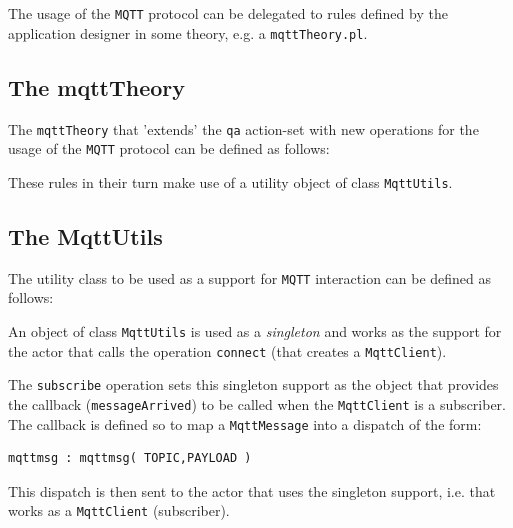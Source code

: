 The usage of the \texttt{MQTT} protocol can be delegated to rules defined by the application designer in some theory, e.g. a \texttt{mqttTheory.pl}. 

\subsection{The mqttTheory}
The \texttt{mqttTheory} that 'extends' the \texttt{qa} action-set with new operations for the usage of the \texttt{MQTT} protocol can be defined as follows:




These rules in their turn make use of a \java{} utility object of class \texttt{MqttUtils}.

\subsection{The MqttUtils}
The \java{} utility class to be used as a support for \texttt{MQTT} interaction can be defined as follows:



An object of class \texttt{MqttUtils} is used as a \textit{singleton} and works as the support for the actor that calls the operation \texttt{connect} (that creates a \texttt{MqttClient}).

The \texttt{subscribe} operation sets this singleton support as the object that provides the callback (\texttt{messageArrived}) to be called when the \texttt{MqttClient} is a subscriber. The callback is defined so to map a \texttt{MqttMessage} into a dispatch of the form:

\begin{Verbatim}[fontsize=\scriptsize, frame=single]
mqttmsg : mqttmsg( TOPIC,PAYLOAD )
\end{Verbatim}

This dispatch is then sent to the actor that uses the singleton support, i.e. that works as a \texttt{MqttClient} (subscriber).


 

 

 
 
